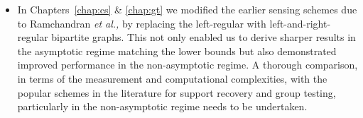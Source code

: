 \begin{itemize}
\item In Chapters~\ref{chap:cs} \& \ref{chap:gt} we modified the earlier sensing schemes due to Ramchandran \textit{et al.,} by replacing the left-regular with left-and-right-regular bipartite graphs. This not only enabled us to derive sharper results in the asymptotic regime matching the lower bounds but also demonstrated improved performance in the non-asymptotic regime. A thorough comparison, in terms of the measurement and computational complexities, with the popular schemes in the literature for support recovery and group testing, particularly in the non-asymptotic regime needs to be undertaken.
\end{itemize}
